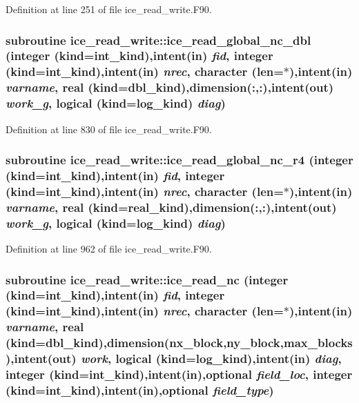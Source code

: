 Definition at line 251 of file ice\_\-read\_\-write.F90.\hypertarget{namespaceice__read__write_a7e7f4faac57a154facfd07a272b2cb76}{
\subsubsection[{ice\_\-read\_\-global\_\-nc\_\-dbl}]{\setlength{\rightskip}{0pt plus 5cm}subroutine ice\_\-read\_\-write::ice\_\-read\_\-global\_\-nc\_\-dbl (integer (kind=int\_\-kind),intent(in) {\em fid}, \/  integer (kind=int\_\-kind),intent(in) {\em nrec}, \/  character (len=$\ast$),intent(in) {\em varname}, \/  real (kind=dbl\_\-kind),dimension(:,:),intent(out) {\em work\_\-g}, \/  logical (kind=log\_\-kind) {\em diag})}}
\label{namespaceice__read__write_a7e7f4faac57a154facfd07a272b2cb76}


Definition at line 830 of file ice\_\-read\_\-write.F90.\hypertarget{namespaceice__read__write_a3fda8cf973518b47282724d7464eddc5}{
\subsubsection[{ice\_\-read\_\-global\_\-nc\_\-r4}]{\setlength{\rightskip}{0pt plus 5cm}subroutine ice\_\-read\_\-write::ice\_\-read\_\-global\_\-nc\_\-r4 (integer (kind=int\_\-kind),intent(in) {\em fid}, \/  integer (kind=int\_\-kind),intent(in) {\em nrec}, \/  character (len=$\ast$),intent(in) {\em varname}, \/  real (kind=real\_\-kind),dimension(:,:),intent(out) {\em work\_\-g}, \/  logical (kind=log\_\-kind) {\em diag})}}
\label{namespaceice__read__write_a3fda8cf973518b47282724d7464eddc5}


Definition at line 962 of file ice\_\-read\_\-write.F90.\hypertarget{namespaceice__read__write_a412c3f66b66a3ff61e7b5c3fb3205889}{
\subsubsection[{ice\_\-read\_\-nc}]{\setlength{\rightskip}{0pt plus 5cm}subroutine ice\_\-read\_\-write::ice\_\-read\_\-nc (integer (kind=int\_\-kind),intent(in) {\em fid}, \/  integer (kind=int\_\-kind),intent(in) {\em nrec}, \/  character (len=$\ast$),intent(in) {\em varname}, \/  real (kind=dbl\_\-kind),dimension(nx\_\-block,ny\_\-block,max\_\-blocks),intent(out) {\em work}, \/  logical (kind=log\_\-kind),intent(in) {\em diag}, \/  integer (kind=int\_\-kind),intent(in),optional {\em field\_\-loc}, \/  integer (kind=int\_\-kind),intent(in),optional {\em field\_\-type})}}
\label{namespaceice__read__write_a412c3f66b66a3ff61e7b5c3fb3205889}


